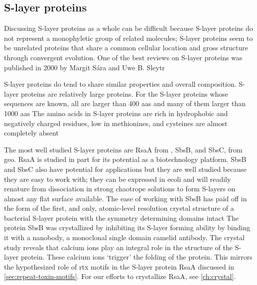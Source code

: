 \subsection{S-layer proteins} \label{sub:intro-slayerproteins} %

Discussing \ac{S-layer} proteins as a whole can be difficult because \ac{S-layer} proteins do not represent a monophyletic group of related molecules; \ac{S-layer} proteins seem to
be unrelated proteins that share a common cellular location and gross structure through convergent evolution. One of the best reviews on \ac{S-layer} proteins was published in 2000
by Margit S\'{a}ra and Uwe B. Sleytr

\ac{S-layer} proteins do tend to share similar properties and overall composition. \ac{S-layer} proteins are relatively large proteins. For the \ac{S-layer} proteins whose
sequences are known, all are larger than 400 \acp{aa} and many of them larger than 1000 \acp{aa} The amino acids in \ac{S-layer} proteins are rich in
hydrophobic and negatively charged residues, low in methionines, and cysteines are almost completely absent

The most well studied \ac{S-layer} proteins are RsaA from \caulobacter{}, SbsB,
and SbsC, from \acl{geo}. RsaA is studied in part for its
potential as a biotechnology platform. SbsB and SbsC also have potential for applications but they are well studied because they are easy to work with; they can be expressed in
\acl{ecoli} and will readily renature from dissociation in strong chaotrope solutions to form \acp{S-layer} on almost any flat surface available. The ease of working with SbsB has
paid off in the form of the first, and only, atomic-level resolution crystal structure of a bacterial \ac{S-layer} protein with the symmetry determining domains
intact The protein SbsB was crystallized by inhibiting its \ac{S-layer} forming ability by binding it with a nanobody, a monoclonal single domain
camelid antibody. The crystal study reveals that calcium ions play an integral role in the structure of the \ac{S-layer} protein. These calcium ions `trigger' the folding of the
protein. This mirrors the hypothesized role of \ac{rtx} motifs in the \caulobacter{} \ac{S-layer} protein RsaA discussed in \cref{sec:repeat-toxin-motifs}. For our efforts to
crystallize RsaA, see \cref{ch:crystal}.
 
